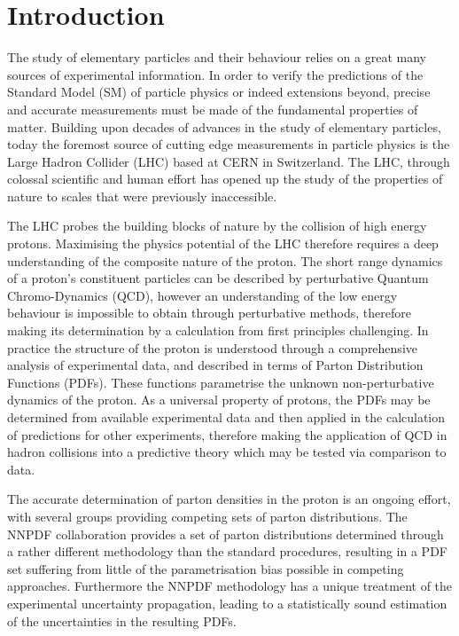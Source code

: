 \chapter*{Introduction}
\label{ch:intro}

The study of elementary particles and their behaviour relies on a great many sources of experimental information.
In order to verify the predictions of the Standard Model (SM) of particle physics or indeed extensions beyond, precise and accurate measurements
must be made of the fundamental properties of matter. Building upon decades of advances in the study of elementary particles,
today the foremost source of cutting edge measurements in particle physics is the Large Hadron Collider (LHC) based at CERN in Switzerland.
The LHC, through colossal scientific and human effort has opened up the study of the properties of nature to scales that were previously inaccessible. 

The LHC probes the building blocks of nature by the collision of high energy protons. Maximising the physics potential of the LHC therefore requires a deep understanding
of the composite nature of the proton. The short range dynamics of a proton's constituent particles can be described by perturbative Quantum Chromo-Dynamics (QCD),
however an understanding of the low energy behaviour is impossible to obtain through perturbative methods, therefore making its determination by a calculation from first principles challenging. In practice the structure of the proton is understood through a comprehensive analysis of experimental data, and described in terms of Parton Distribution Functions (PDFs). These functions parametrise the unknown non-perturbative dynamics of the proton. As a universal property of protons, the PDFs may be determined from available experimental data and then applied in the calculation of predictions for other experiments, therefore making the application of QCD in hadron collisions into a predictive theory which may be tested via comparison to data.

The accurate determination of parton densities in the proton is an ongoing effort, with several groups providing competing sets of parton distributions. The NNPDF collaboration provides a set of parton distributions determined through a rather different methodology than the standard procedures, resulting in a PDF set suffering from little of the parametrisation bias possible in competing approaches. Furthermore the NNPDF methodology has a unique treatment of the experimental uncertainty propagation, leading to a statistically sound estimation of the uncertainties in the resulting PDFs.

